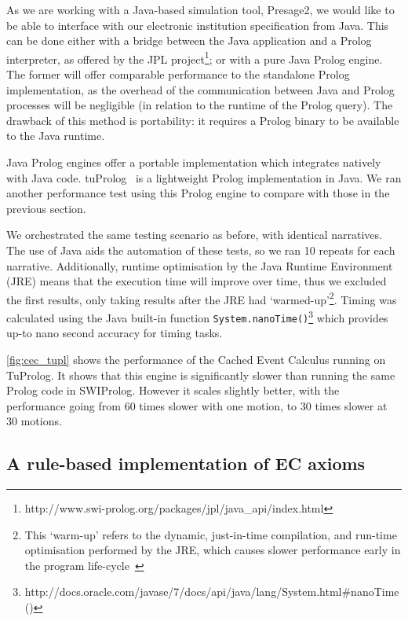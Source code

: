 As we are working with a Java-based simulation tool, Presage2, we would like
to be able to interface with our electronic institution specification from
Java. This can be done either with a bridge between the Java application and a
Prolog interpreter, as offered by the JPL project\footnote{http://www.swi-prolog.org/packages/jpl/java\_api/index.html}; or with a pure Java Prolog
engine. The former will offer comparable performance to the standalone Prolog
implementation, as the overhead of the communication between Java and Prolog
processes will be negligible (in relation to the runtime of the Prolog query).
The drawback of this method is portability: it requires a Prolog binary to be
available to the Java runtime.

Java Prolog engines offer a portable implementation which integrates natively
with Java code. tuProlog~\citep{Denti2005} is a lightweight Prolog
implementation in Java. We ran another performance test using this Prolog
engine to compare with those in the previous section.

We orchestrated the same testing scenario as before, with
identical narratives. The use of Java aids the automation of these tests, so
we ran 10 repeats for each narrative. Additionally, runtime optimisation by
the Java Runtime Environment (JRE) means that the execution time will improve over
time, thus we excluded the first results, only taking results after the JRE had
`warmed-up'\footnote{This `warm-up' refers to the dynamic, just-in-time compilation, and run-time optimisation performed by the JRE, which causes slower performance early in the program life-cycle~\citep{Blackburn2008}}. 
Timing was calculated using the Java built-in function
\texttt{System.nanoTime()}\footnote{http://docs.oracle.com/javase/7/docs/api/java/lang/System.html\#nanoTime()} 
which provides up-to nano second accuracy for timing tasks.

\autoref{fig:cec_tupl} shows the performance of the Cached Event Calculus running on
TuProlog. It shows that this engine is significantly slower than running the
same Prolog code in SWIProlog. However it scales slightly better, with the
performance going from 60 times slower with one motion, to 30 times slower at 30
motions.


\subsection{A rule-based implementation of EC axioms}

